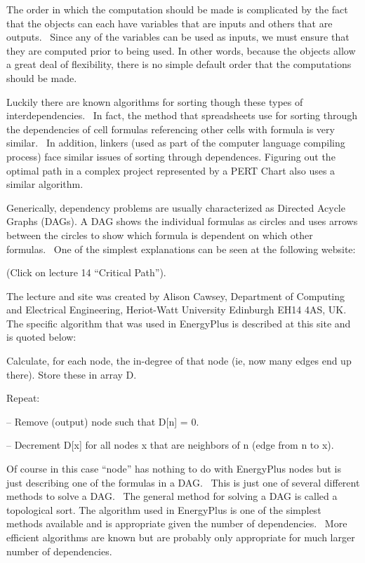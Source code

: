 The order in which the computation should be made is complicated by the fact that the objects can each have variables that are inputs and others that are outputs.~ Since any of the variables can be used as inputs, we must ensure that they are computed prior to being used. In other words, because the objects allow a great deal of flexibility, there is no simple default order that the computations should be made.

Luckily there are known algorithms for sorting though these types of interdependencies.~ In fact, the method that spreadsheets use for sorting through the dependencies of cell formulas referencing other cells with formula is very similar.~ In addition, linkers (used as part of the computer language compiling process) face similar issues of sorting through dependences. Figuring out the optimal path in a complex project represented by a PERT Chart also uses a similar algorithm.

Generically, dependency problems are usually characterized as Directed Acycle Graphs (DAGs). A DAG shows the individual formulas as circles and uses arrows between the circles to show which formula is dependent on which other formulas.~ One of the simplest explanations can be seen at the following website:

(Click on lecture 14 ``Critical Path'').

The lecture and site was created by Alison Cawsey, Department of Computing and Electrical Engineering, Heriot-Watt University Edinburgh EH14 4AS, UK.~ The specific algorithm that was used in EnergyPlus is described at this site and is quoted below:

Calculate, for each node, the in-degree of that node (ie, now many edges end up there). Store these in array D.

Repeat:

-- Remove (output) node such that D{[}n{]} = 0.

-- Decrement D{[}x{]} for all nodes x that are neighbors of n (edge from n to x).

Of course in this case ``node'' has nothing to do with EnergyPlus nodes but is just describing one of the formulas in a DAG.~ This is just one of several different methods to solve a DAG.~ The general method for solving a DAG is called a topological sort. The algorithm used in EnergyPlus is one of the simplest methods available and is appropriate given the number of dependencies.~ More efficient algorithms are known but are probably only appropriate for much larger number of dependencies.

